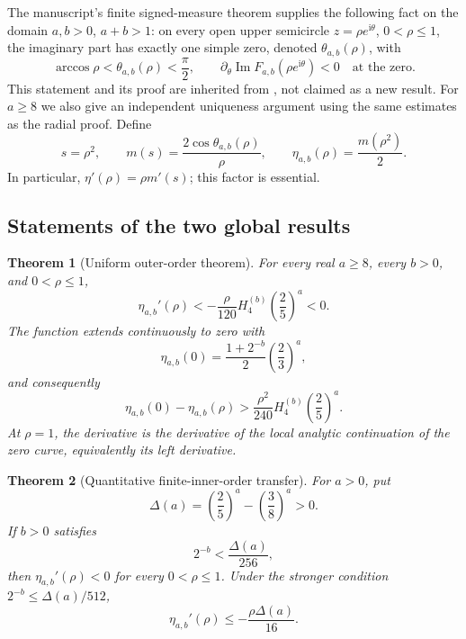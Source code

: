 \documentclass[11pt,letterpaper]{article}
\numberwithin{equation}{section}
\newtheorem{theorem}{Theorem}[section]
\theoremstyle{definition}
\theoremstyle{remark}
\DeclareMathOperator{\Imn}{Im}
\newcommand{\ii}{\mathrm i}
\begin{document}
The manuscript's finite signed-measure theorem supplies the following
fact on the domain $a,b>0$, $a+b>1$: on every open upper semicircle
$z=\rho e^{\ii\theta}$, $0<\rho\le1$, the imaginary part has exactly one
simple zero, denoted $\theta_{a,b}(\rho)$, with
\begin{equation}\label{eq:inherited-angle}
 \arccos\rho<\theta_{a,b}(\rho)<\frac\pi2,
 \qquad \partial_\theta\Imn F_{a,b}(\rho e^{\ii\theta})<0
 \quad\text{at the zero}.
\end{equation}
This statement and its proof are inherited from \cite{repo-orders},
not claimed as a new result. For $a\ge8$ we also give an independent
uniqueness argument using the same estimates as the radial proof.
Define
\begin{equation}\label{eq:normalization}
 s=\rho^2,\qquad
 m(s)=\frac{2\cos\theta_{a,b}(\rho)}\rho,\qquad
 \eta_{a,b}(\rho)=\frac{m(\rho^2)}2.
\end{equation}
In particular, $\eta'(\rho)=\rho m'(s)$; this factor is essential.

\subsection{Statements of the two global results}
\begin{theorem}[Uniform outer-order theorem]\label{thm:main}
For every real $a\ge8$, every $b>0$, and $0<\rho\le1$,
\begin{equation}\label{eq:main-bound}
 \eta_{a,b}'(\rho)
 <-\frac{\rho}{120}H_4^{(b)}\left(\frac25\right)^a<0.
\end{equation}
The function extends continuously to zero with
\begin{equation}\label{eq:initial}
 \eta_{a,b}(0)=\frac{1+2^{-b}}2\left(\frac23\right)^a,
\end{equation}
and consequently
\begin{equation}\label{eq:gap}
 \eta_{a,b}(0)-\eta_{a,b}(\rho)
 >\frac{\rho^2}{240}H_4^{(b)}\left(\frac25\right)^a.
\end{equation}
At $\rho=1$, the derivative is the derivative of the local analytic
continuation of the zero curve, equivalently its left derivative.
\end{theorem}

\begin{theorem}[Quantitative finite-inner-order transfer]\label{thm:large-b}
For $a>0$, put
\begin{equation}\label{eq:delta}
 \Delta(a)=\left(\frac25\right)^a-\left(\frac38\right)^a>0.
\end{equation}
If $b>0$ satisfies
\begin{equation}\label{eq:large-b-condition}
 2^{-b}<\frac{\Delta(a)}{256},
\end{equation}
then $\eta_{a,b}'(\rho)<0$ for every $0<\rho\le1$.
Under the stronger condition $2^{-b}\le\Delta(a)/512$,
\begin{equation}\label{eq:large-b-gap}
 \eta_{a,b}'(\rho)\le-\frac{\rho\Delta(a)}{16}.
\end{equation}
\end{theorem}
\end{document}

